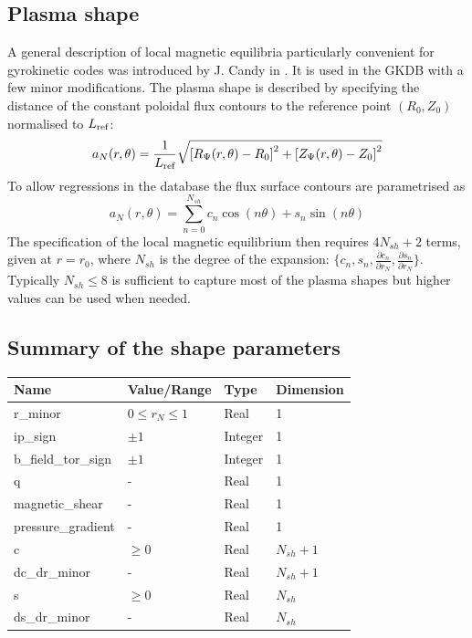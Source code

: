 \documentclass[fleqn]{report}
\begin{document}
\subsection{Plasma shape}
A general description of local magnetic equilibria particularly convenient for gyrokinetic codes was introduced by J. Candy in \cite {Candy:PPCF2009}. It is used in the GKDB with a few minor modifications.
The plasma shape is described by specifying the distance of the constant poloidal flux contours to the reference point $(R_0,Z_0)$  normalised to $L_{\textrm{ref}}$:
$$ a_N(r,\theta) = \frac{1}{L_{\textrm{ref}}}\sqrt{\left[R_{\Psi}(r,\theta)-R_0\right]^2 + \left[Z_{\Psi}(r,\theta)-Z_0\right]^2} $$
To allow regressions in the database the flux surface contours are parametrised as 
$$ a_N(r,\theta) = \sum_{n=0}^{N_{sh}} c_n \cos(n\theta) + s_n \sin(n\theta) $$
The specification of the local magnetic equilibrium then requires $4N_{sh}+2$ terms, given at $r=r_0$, where $N_{sh}$ is the degree of the expansion: $\{c_n,s_n,\frac{\partial c_n}{\partial r_N},\frac{\partial s_n}{\partial r_N}\}$. Typically $N_{sh}\leq8$ is sufficient to capture most of the plasma shapes but higher values can be used when needed.

\subsection{Summary of the shape parameters}
\begin{tabularx}{\textwidth}{|X|Y|Y|Y|}
\hline
Name & Value/Range & Type & Dimension \\
\hline
r\_minor & $0\leq r_N \leq 1$ & Real & 1 \\
ip\_sign & $\pm 1$ & Integer & 1 \\
b\_field\_tor\_sign & $\pm 1$ & Integer & 1 \\
q & - & Real & 1 \\
magnetic\_shear & - & Real & 1 \\
pressure\_gradient & - & Real & 1 \\
c & $\geq 0$ & Real & $N_{sh}+1$ \\
dc\_dr\_minor & - & Real & $N_{sh}+1$ \\
s & $\geq 0$ & Real & $N_{sh}$ \\
ds\_dr\_minor & - & Real & $N_{sh}$ \\
\hline
\end{tabularx}
\end{document}
